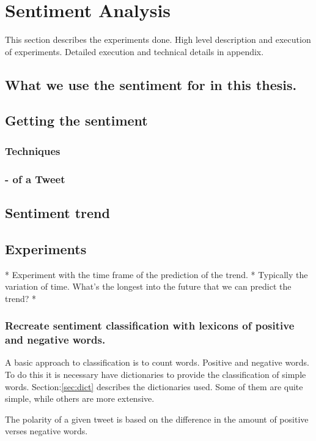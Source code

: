 
\chapter{Sentiment Analysis}
This section describes the experiments done. High level description and
execution of experiments. Detailed execution and technical details in appendix. 

\section{What we use the sentiment for in this thesis.}
\section{Getting the sentiment}
\subsection{Techniques}
\subsection{- of a Tweet}
\section{Sentiment trend}
\section{Experiments}

* Experiment with the time frame of the prediction of the trend. 
	* Typically the variation of time. What's the longest into the future that
we can predict the trend?
* 

\subsection{Recreate sentiment classification with lexicons of positive and
negative words.}

A basic approach to classification is to count words. Positive and negative
words. To do this it is necessary have dictionaries to provide the
classification of simple words. Section:\ref{sec:dict} describes the
dictionaries used. Some of them are quite simple, while others are more
extensive. 

The polarity of a given tweet is based on the difference in the amount of
positive verses negative words. 

